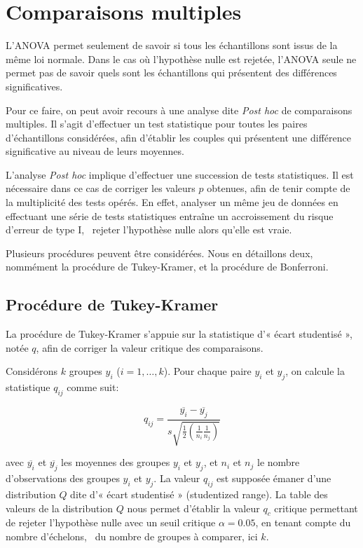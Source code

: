 \section{Comparaisons multiples}
\label{app:multcmp}

L'ANOVA permet seulement de savoir si tous les échantillons sont issus de la même loi normale. Dans le cas où l'hypothèse nulle est rejetée, l'ANOVA seule ne permet pas de savoir quels sont les échantillons qui présentent des différences significatives. 

Pour ce faire, on peut avoir recours à une analyse dite \emph{Post hoc} de comparaisons multiples. Il s'agit d'effectuer un test statistique pour toutes les paires d'échantillons considérées, afin d'établir les couples qui présentent une différence significative au niveau de leurs moyennes. 

L'analyse \emph{Post hoc} implique d'effectuer une succession de tests statistiques. Il est nécessaire dans ce cas de corriger les valeurs $p$ obtenues, afin de tenir compte de la multiplicité des tests opérés. En effet, analyser un même jeu de données en effectuant une série de tests statistiques entraîne un accroissement du risque d'erreur de type I, \ie~rejeter l'hypothèse nulle alors qu'elle est vraie.

Plusieurs procédures peuvent être considérées. Nous en détaillons deux, nommément la procédure de Tukey-Kramer, et la procédure de Bonferroni.

\subsection*{Procédure de Tukey-Kramer}
\label{app:tukey}

La procédure de Tukey-Kramer s'appuie sur la statistique d'« écart studentisé », notée $q$, afin de corriger la valeur critique des comparaisons. 

Considérons $k$ groupes $y_i$ ($i=1,\ldots,k$). Pour chaque paire $y_i$ et $y_j$, on calcule la statistique $q_{ij}$ comme suit: 

\begin{equation}
q_{ij}=\dfrac{\overline{y_{i}}-\overline{y_{j}}}{s\sqrt{\frac{1}{2}(\frac{1}{n_{i}} \frac{1}{n_{j}})}}
\end{equation}

avec $\overline{y_{i}}$ et $\overline{y_{j}}$ les moyennes des groupes $y_i$ et $y_j$, et $n_{i}$ et $n_{j}$ le nombre d'observations des groupes $y_{i}$ et $y_{j}$. La valeur $q_{ij}$ est supposée émaner d'une distribution $Q$ dite d'« écart studentisé » (studentized range). La table des valeurs de la distribution $Q$ nous permet d'établir la valeur $q_c$ critique permettant de rejeter l'hypothèse nulle avec un seuil critique $\alpha=0.05$, en tenant compte du nombre d'échelons, \ie~du nombre de groupes à comparer, ici $k$.

